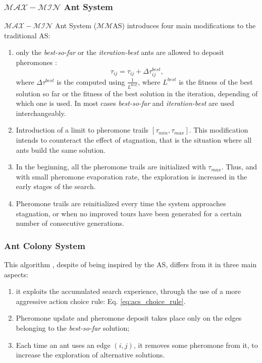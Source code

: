 					\subsubsection*{$\mathcal{MAX}-\mathcal{MIN}$ Ant System}
					$\mathcal{MAX}-\mathcal{MIN}$ Ant System ($\mathcal{MM}$AS) introduces four main modifications to the traditional AS:
					\begin{enumerate}
						\item only the \emph{best-so-far} or the \emph{iteration-best} ants are allowed to deposit pheromones \cite{stutzle00}:
							\begin{equation}
								\label{eq:max_min_rank_pheromone_update}
								\tau_{ij} = \tau_{ij} + \Delta\tau_{ij}^{best},
							\end{equation}
							\noindent where $\Delta\tau^{best}$ is the computed using $\frac{1} {L^{best}}$, where ${L^{best}}$ is the fitness of the best solution so far or the fitness of the best solution in the iteration, depending of which one is used. In most cases \emph{best-so-far} and \emph{iteration-best} are used interchangeably.
						
						\item Introduction of a limit to pheromone trails $[\tau_{min},\tau_{max}]$. This modification intends to counteract the effect of stagnation, that is the situation where all ants build the same solution.
						
						\item In the beginning, all the pheromone trails are initialized with $\tau_{max}$. Thus, and with small pheromone evaporation rate, the exploration is increased in the early stages of the search.
						
						\item Pheromone trails are reinitialized every time the system approaches stagnation, or when no improved tours have been generated for a certain number of consecutive generations.
						 					
					\end{enumerate}
		
					\subsubsection*{Ant Colony System}
					\label{sec:acs}
					This algorithm \cite{dorigo97}, despite of being inspired by the AS, differs from it in three main aspects:
					\begin{enumerate}
						\item it exploits the accumulated search experience, through the use of a more aggressive action choice rule: Eq. \ref{eq:acs_choice_rule}. 
						\item Pheromone update and pheromone deposit takes place only on the edges belonging to the \emph{best-so-far} solution;
						\item Each time an ant uses an edge $(i,j)$, it removes some pheromone from it, to increase the exploration of alternative solutions.
					\end{enumerate}

